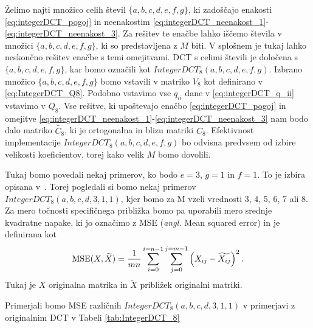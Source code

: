\documentclass[a4paper,12pt,openright]{book}
\begin{document}
Želimo najti množico celih števil $\{a,b,c,d,e,f,g\}$, ki zadoščajo enakosti \eqref{eq:integerDCT_pogoj} in neenakostim \eqref{eq:integerDCT_neenakost_1}-\eqref{eq:integerDCT_neenakost_3}. Za rešitev te enačbe lahko iščemo števila v množici $\{a,b,c,d,e,f,g\}$, ki so predstavljena z $M$ biti. V splošnem je tukaj lahko neskončno rešitev enačbe s temi omejitvami. DCT s celimi števili je določena s $\{a,b,c,d,e,f,g\}$, kar bomo označili kot $IntegerDCT_8(a,b,c,d,e,f,g)$. Izbrano množico $\{a,b,c,d,e,f,g\}$ bomo vstavili v matriko $V_8$ kot definirano v \eqref{eq:IntegerDCT_Q8}. Podobno vstavimo vse $q_{ii}$ dane v \eqref{eq:integerDCT_q_ii} vstavimo v $Q_8$. Vse rešitve, ki upoštevajo enačbo \eqref{eq:integerDCT_pogoj} in omejitve \eqref{eq:integerDCT_neenakost_1}-\eqref{eq:integerDCT_neenakost_3} nam bodo dalo matriko $\widetilde{C_8}$, ki je ortogonalna in blizu matriki $C_8$. Efektivnost implementacije $IntegerDCT_8(a,b,c,d,e,f,g)$ bo odvisna predvsem od izbire velikosti koeficientov, torej kako velik $M$ bomo dovolili.\par
Tukaj bomo povedali nekaj primerov, ko bodo $e=3$, $g=1$ in $f =1$. To je izbira opisana v~\cite{britanak2010discrete}. Torej pogledali si bomo nekaj primerov $IntegerDCT_8(a,b,c,d,3,1,1)$, kjer bomo za M vzeli vrednosti 3, 4, 5, 6, 7 ali 8. Za mero točnosti specifičnega približka bomo pa uporabili mero srednje kvadratne napake, ki jo označimo z MSE (\textit{angl.} Mean squared error) in je definirana kot
\begin{equation} %
  \hbox{MSE}(X, \widetilde{X}) = \frac{1}{mn}\sum_{i=0}^{i=n-1}\sum_{j=0}^{j=m-1}\left(X_{ij} - \widetilde{X_{ij}} \right)^2.
\label{eq:MSE}
\end{equation}
Tukaj je $X$ originalna matrika in $\widetilde{X}$ približek originalni matriki.\par
Primerjali bomo MSE različnih $IntegerDCT_8(a,b,c,d,3,1,1)$ v primerjavi z originalnim DCT v Tabeli \ref{tab:IntegerDCT_8}
\end{document}
